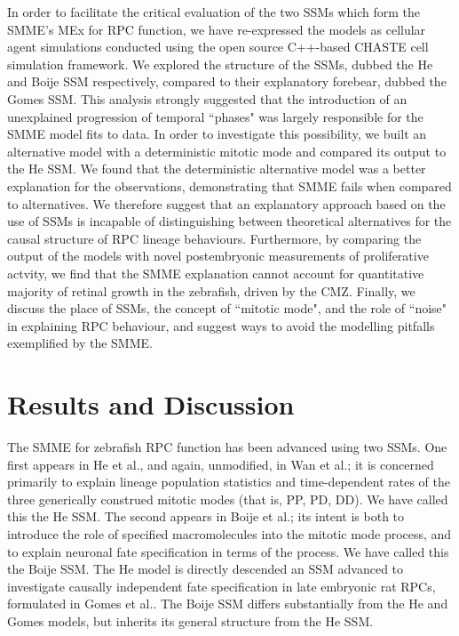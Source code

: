 In order to facilitate the critical evaluation of the two SSMs which form the SMME's MEx for RPC function, we have re-expressed the models as cellular agent simulations conducted using the open source C++-based CHASTE cell simulation framework\cite{Mirams2013}. We explored the structure of the SSMs, dubbed the He and Boije SSM respectively, compared to their explanatory forebear, dubbed the Gomes SSM\cite{Gomes2011}. This analysis strongly suggested that the introduction of an unexplained progression of temporal ``phases" was largely responsible for the SMME model fits to data. In order to investigate this possibility, we built an alternative model with a deterministic mitotic mode and compared its output to the He SSM. We found that the deterministic alternative model was a better explanation for the observations, demonstrating that SMME fails when compared to alternatives. We therefore suggest that an explanatory approach based on the use of SSMs is incapable of distinguishing between theoretical alternatives for the causal structure of RPC lineage behaviours. Furthermore, by comparing the output of the models with novel postembryonic measurements of proliferative actvity, we find that the SMME explanation cannot account for quantitative majority of retinal growth in the zebrafish, driven by the CMZ. Finally, we discuss the place of SSMs, the concept of ``mitotic mode", and the role of ``noise" in explaining RPC behaviour, and suggest ways to avoid the modelling pitfalls exemplified by the SMME.

\section{Results and Discussion}

The SMME for zebrafish RPC function has been advanced using two SSMs. One first appears in He et al., and again, unmodified, in Wan et al.\cite{He2012,Wan2016}; it is concerned primarily to explain lineage population statistics and time-dependent rates of the three generically construed mitotic modes (that is, PP, PD, DD). We have called this the He SSM. The second appears in Boije et al.\cite{Boije2015}; its intent is both to introduce the role of specified macromolecules into the mitotic mode process, and to explain neuronal fate specification in terms of the process. We have called this the Boije SSM. The He model is directly descended an SSM advanced to investigate causally independent fate specification in late embryonic rat RPCs, formulated in Gomes et al.\cite{Gomes2011}. The Boije SSM differs substantially from the He and Gomes models, but inherits its general structure from the He SSM.

